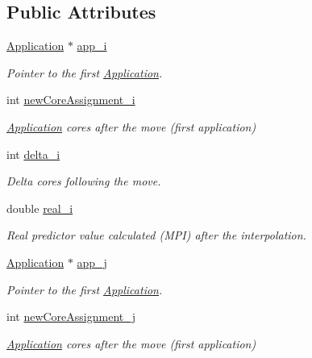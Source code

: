 \subsection*{Public Attributes}
\begin{DoxyCompactItemize}
\item 
\hyperlink{classApplication}{Application} $\ast$ \hyperlink{classCandidate_a1bfed0429bba41f57dce0fbd37225c2c}{app\-\_\-i}
\begin{DoxyCompactList}\small\item\em Pointer to the first \hyperlink{classApplication}{Application}. \end{DoxyCompactList}\item 
int \hyperlink{classCandidate_a859313416296683b7c0496d842dab48a}{new\-Core\-Assignment\-\_\-i}
\begin{DoxyCompactList}\small\item\em \hyperlink{classApplication}{Application} cores after the move (first application) \end{DoxyCompactList}\item 
int \hyperlink{classCandidate_ab1033e1f3e0060f0773c7d9268c2ce0b}{delta\-\_\-i}
\begin{DoxyCompactList}\small\item\em Delta cores following the move. \end{DoxyCompactList}\item 
double \hyperlink{classCandidate_a93a050a3128d98f446176d9411535eea}{real\-\_\-i}
\begin{DoxyCompactList}\small\item\em Real predictor value calculated (M\-P\-I) after the interpolation. \end{DoxyCompactList}\item 
\hyperlink{classApplication}{Application} $\ast$ \hyperlink{classCandidate_a8b0f26e8b45e9a3331be8a9694d3be5e}{app\-\_\-j}
\begin{DoxyCompactList}\small\item\em Pointer to the first \hyperlink{classApplication}{Application}. \end{DoxyCompactList}\item 
int \hyperlink{classCandidate_a1203966358bd849169b5f967de3c2bf7}{new\-Core\-Assignment\-\_\-j}
\begin{DoxyCompactList}\small\item\em \hyperlink{classApplication}{Application} cores after the move (first application) \end{DoxyCompactList}\item 

\end{DoxyCompactItemize}
